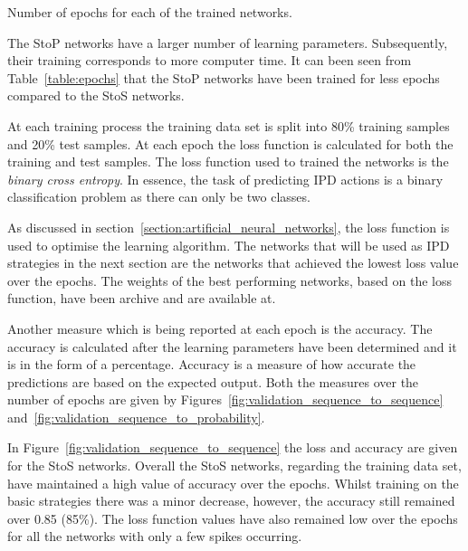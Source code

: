 \begin{table}[!htbp]
    \begin{center}
    \resizebox{.9\textwidth}{!}{
        
    }
\end{center}
\caption{Number of epochs for each of the trained networks.}\label{table:epochs}
\end{table}

The StoP networks have a larger number of learning parameters. Subsequently,
their training corresponds to more computer time. It can been seen from
Table~\ref{table:epochs} that the StoP networks have been trained for less
epochs compared to the StoS networks.

At each training process the training data set is split into 80\% training samples
and 20\% test samples. At each epoch the loss function is calculated for both
the training and test samples. The loss function used to trained the networks
is the \textit{binary cross entropy}. In essence, the task of predicting IPD
actions is a binary classification problem as there can only be two classes.

As discussed in section~\ref{section:artificial_neural_networks}, the loss
function is used to optimise the learning algorithm. The networks that will
be used as IPD strategies in the next section are the networks that achieved
the lowest loss value over the epochs. The weights of the best performing
networks, based on the loss function, have been archive and are available at. %

Another measure which is being reported at each epoch is the accuracy. The accuracy
is calculated after the learning parameters have been determined and it is in
the form of a percentage. Accuracy is a measure of how accurate the predictions
are based on the expected output. Both the measures over the number of epochs
are given by Figures~\ref{fig:validation_sequence_to_sequence}
and~\ref{fig:validation_sequence_to_probability}.

In Figure~\ref{fig:validation_sequence_to_sequence} the loss and accuracy are
given for the StoS networks. Overall the StoS networks, regarding the training
data set, have maintained a high value of accuracy over the epochs. Whilst
training on the basic strategies there was a minor decrease, however, the
accuracy still remained over 0.85 (85\%). The loss function values have also
remained low over the epochs for all the networks with only a few spikes
occurring.

